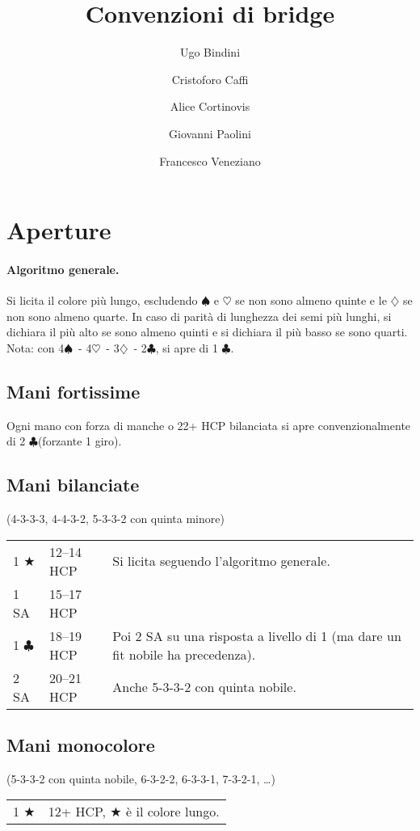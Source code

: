 \documentclass[a4paper,10pt]{article}
\title{Convenzioni di bridge}
\author{Ugo Bindini \and Cristoforo Caffi \and Alice Cortinovis \and Giovanni Paolini \and Francesco Veneziano}
\renewcommand{\c}{$\clubsuit$\xspace}
\renewcommand{\d}{$\diamondsuit$\xspace}
\newcommand{\h}{$\heartsuit$\xspace}
\newcommand{\s}{$\spadesuit$\xspace}
\renewcommand{\j}{$\bigstar$\xspace}
\newcommand{\sa}{SA\xspace}
\newcommand{\smallspace}{\vskip0.3cm}
\newenvironment{twocol}
  {\smallspace\noindent\begin{tabular}{l p{0.78\textwidth}}}
  {\end{tabular}\smallspace}
\newenvironment{threecol}
  {\smallspace\noindent\begin{tabular}{l l p{0.78\textwidth}}}
  {\end{tabular}\smallspace}
\begin{document}
\maketitle

\tableofcontents

\pagebreak
\section{Aperture}

\paragraph{Algoritmo generale.}
Si licita il colore più lungo, escludendo \s e \h se non sono almeno quinte e le \d se non sono almeno quarte.
In caso di parità di lunghezza dei semi più lunghi, si dichiara il più alto se sono almeno quinti e si dichiara il più basso se sono quarti.
Nota: con 4\s\ - 4\h\ - 3\d\ - 2\c, si apre di 1 \c.

\subsection{Mani fortissime}

Ogni mano con forza di manche o 22+ HCP bilanciata si apre convenzionalmente di 2 \c (forzante 1 giro).

\subsection{Mani bilanciate}
(4-3-3-3, 4-4-3-2, 5-3-3-2 con quinta minore)
\smallspace

\begin{threecol}
 1 \j & 12--14 HCP & Si licita seguendo l'algoritmo generale. \\
 1 \sa & 15--17 HCP & \\
 1 \c & 18--19 HCP & Poi 2 \sa su una risposta a livello di 1 (ma dare un fit nobile ha precedenza). \\
 2 \sa & 20--21 HCP & Anche 5-3-3-2 con quinta nobile.
\end{threecol}


\subsection{Mani monocolore}
(5-3-3-2 con quinta nobile, 6-3-2-2, 6-3-3-1, 7-3-2-1, \dots)

\begin{twocol}
 1 \j & 12+ HCP, \j è il colore lungo.
\end{twocol}
\end{document}
